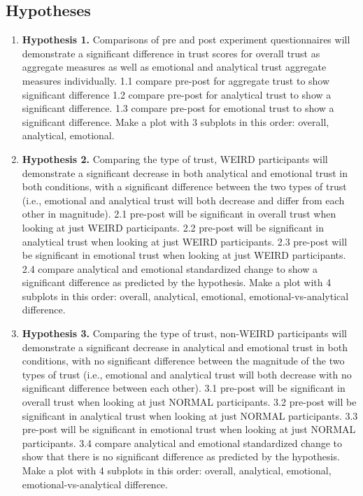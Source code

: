 \subsection{Hypotheses}
\begin{enumerate}
\item \textbf{Hypothesis 1.} Comparisons of pre and post experiment questionnaires will demonstrate a significant difference in trust scores for overall trust as aggregate measures as well as emotional and analytical trust aggregate measures individually.
1.1 compare pre-post for aggregate trust to show significant difference
1.2 compare pre-post for analytical trust to show a significant difference.
1.3 compare pre-post for emotional trust to show a significant difference.
Make a plot with 3 subplots in this order: overall, analytical, emotional.
\item \textbf{Hypothesis 2.} Comparing the type of trust, WEIRD participants will demonstrate a significant decrease in both analytical and emotional trust in both conditions, with a significant difference between the two types of trust (i.e., emotional and analytical trust will both decrease and differ from each other in magnitude).
2.1 pre-post will be significant in overall trust when looking at just WEIRD participants.
2.2 pre-post will be significant in analytical trust when looking at just WEIRD participants.
2.3 pre-post will be significant in emotional trust when looking at just WEIRD participants.
2.4 compare analytical and emotional standardized change to show a significant difference as predicted by the hypothesis.
Make a plot with 4 subplots in this order: overall, analytical, emotional, emotional-vs-analytical difference.
\item \textbf{Hypothesis 3.} Comparing the type of trust, non-WEIRD participants will demonstrate a significant decrease in analytical and emotional trust in both conditions, with no significant difference between the magnitude of the two types of trust (i.e., emotional and analytical trust will both decrease with no significant difference between each other).
3.1 pre-post will be significant in overall trust when looking at just NORMAL participants.
3.2 pre-post will be significant in analytical trust when looking at just NORMAL participants.
3.3 pre-post will be significant in emotional trust when looking at just NORMAL participants.
3.4 compare analytical and emotional standardized change to show that there is no significant difference as predicted by the hypothesis.
Make a plot with 4 subplots in this order: overall, analytical, emotional, emotional-vs-analytical difference.

\end{enumerate}
